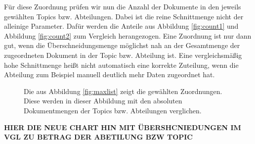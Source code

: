 \documentclass[german,version-2020-11]{uzl-thesis}
\begin{document}
\begin{itemize}
\begin{enumerate}
Für diese Zuordnung prüfen wir nun die Anzahl der Dokumente in den jeweils gewählten Topics bzw. Abteilungen. Dabei ist die reine Schnittmenge nicht der alleinige Parameter. Dafür werden die Anteile aus Abbildung \ref{fig:count1} und Abbildung \ref{fig:count2} zum Vergleich herangezogen. Eine Zuordnung ist nur dann gut, wenn die Überschneidungsmenge möglichst nah an der Gesamtmenge der zugeordneten Dokument in der Topic bzw. Abteilung ist. Eine vergleichsmäßig hohe Schnittmenge heißt nicht automatisch eine korrekte Zuteilung, wenn die Abteilung zum Beispiel manuell deutlich mehr Daten zugeordnet hat.

\begin{figure}[h]
\begin{center}
\end{center}
\caption{Die aus Abbildung \ref{fig:maxlist} zeigt die gewählten Zuordnungen. Diese werden in dieser Abbildung mit den absoluten Dokumentmengen der Topics bzw. Abteilungen verglichen.}
\label{fig:comp}
\end{figure}
\textbf{HIER DIE NEUE CHART HIN MIT ÜBERSHCNIEDUNGEN IM VGL ZU BETRAG DER ABETILUNG BZW TOPIC}


\end{enumerate}
\end{itemize}
\end{document}

